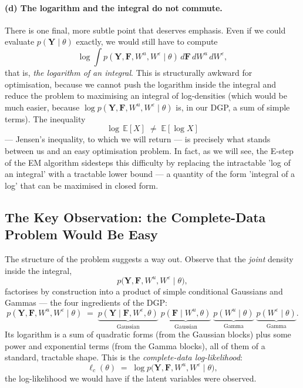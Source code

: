 \documentclass[11pt, a4paper, oneside]{article}
\newcommand{\mY}{\mathbf{Y}}
\newcommand{\mF}{\mathbf{F}}
\begin{document}
\paragraph{(d) The logarithm and the integral do not commute.}
There is one final, more subtle point that deserves emphasis. Even if
we could evaluate $p(\mY \mid \theta)$ exactly, we would still have to
compute
\[
\log \int p(\mY, \mF, W^u, W^\varepsilon \mid \theta)\, d\mF\, dW^u\, dW^\varepsilon,
\]
that is, \emph{the logarithm of an integral}. This is structurally awkward
for optimisation, because we cannot push the logarithm inside the integral
and reduce the problem to maximising an integral of log-densities (which
would be much easier, because $\log p(\mY, \mF, W^u, W^\varepsilon \mid \theta)$
is, in our DGP, a sum of simple terms). The inequality
\[
\log\, \mathbb{E}[X] \;\neq\; \mathbb{E}[\log X]
\]
— Jensen's inequality, to which we will return — is precisely what stands
between us and an easy optimisation problem. In fact, as we will see, 
the E-step of the EM algorithm sidesteps this difficulty by replacing the intractable 'log of an integral' 
with a tractable lower bound — a quantity of the form 'integral of a log' that can be maximised in closed form.


\newpage 
\subsection{The Key Observation: the Complete-Data Problem Would Be Easy}

The structure of the problem suggests a way out. Observe that the
\emph{joint} density inside the integral,
\[
p\big(\mY, \mF, W^u, W^\varepsilon \mid \theta\big),
\]
factorises by construction into a product of simple conditional Gaussians
and Gammas — the four ingredients of the DGP:
\[
p(\mY, \mF, W^u, W^\varepsilon \mid \theta) \;=\;
\underbrace{p(\mY \mid \mF, W^\varepsilon, \theta)}_{\text{Gaussian}}\;
\underbrace{p(\mF \mid W^u, \theta)}_{\text{Gaussian}}\;
\underbrace{p(W^u \mid \theta)}_{\text{Gamma}}\;
\underbrace{p(W^\varepsilon \mid \theta)}_{\text{Gamma}}.
\] 
Its logarithm is a sum of quadratic forms (from the Gaussian blocks) plus some power
and exponential terms (from the Gamma blocks), all of them of a standard,
tractable shape. This is the \emph{complete-data log-likelihood}:
\[
\ell_c(\theta) \;=\; \log p\big(\mY, \mF, W^u, W^\varepsilon \mid \theta\big),
\]
the log-likelihood we would have if the latent variables were observed.
\end{document}
